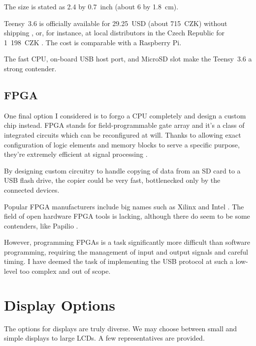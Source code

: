             The size is stated as 2.4 by 0.7~inch (about 6 by 1.8~cm).
            
            Teensy~3.6 is officially available for 29.25~USD (about 715~CZK) without shipping \cite{teensy-36}, or, for instance, at local distributors in the Czech Republic for 1~198~CZK \cite{teensy-36-snailshop}.  The cost is comparable with a Raspberry Pi.  %
            
            The fast CPU, on-board USB host port, and MicroSD slot make the Teensy~3.6 a strong contender.
            
            
        \subsection{FPGA}
            One final option I considered is to forgo a CPU completely and design a custom chip instead.  FPGA stands for field-programmable gate array and it's a class of integrated circuits which can be reconfigured at will.  Thanks to allowing exact configuration of logic elements and memory blocks to serve a specific purpose, they're extremely efficient at signal processing \cite{sadrozinski2016applications}.
            
            By designing custom circuitry to handle copying of data from an SD card to a USB flash drive, the copier could be very fast, bottlenecked only by the connected devices.
            
            Popular FPGA manufacturers include big names such as Xilinx \cite{fpga-xilinx} and Intel \cite{fpga-intel}.  The field of open hardware FPGA tools is lacking, although there do seem to be some contenders, like Papilio \cite{fpga-papilio}. 
            
            However, programming FPGAs is a task significantly more difficult than software programming, requiring the management of input and output signals and careful timing.  I have deemed the task of implementing the USB protocol at such a low-level too complex and out of scope.
            
    \section{Display Options}
        The options for displays are truly diverse.  We may choose between small and simple displays to large LCDs.  A few representatives are provided.
        
